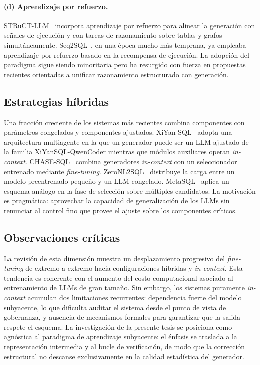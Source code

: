 \paragraph{(d) Aprendizaje por refuerzo.} STRuCT-LLM~\cite{STRuCT-LLM2025}
incorpora aprendizaje por refuerzo para alinear la generación con
señales de ejecución y con tareas de razonamiento sobre tablas y grafos
simultáneamente. Seq2SQL~\cite{Seq2SQL2017}, en una época mucho más
temprana, ya empleaba aprendizaje por refuerzo basado en la recompensa de
ejecución. La adopción del paradigma sigue siendo minoritaria pero ha
resurgido con fuerza en propuestas recientes orientadas a unificar
razonamiento estructurado con generación.

\subsection{Estrategias híbridas}
\label{subsec:sota-d1-hibridas}

Una fracción creciente de los sistemas más recientes combina componentes
con parámetros congelados y componentes ajustados.
XiYan-SQL~\cite{XiYan-SQL2024} adopta una arquitectura multiagente en la que
un generador puede ser un \ac{LLM} ajustado de la familia
XiYanSQL-QwenCoder mientras que módulos auxiliares operan
\emph{in-context}. CHASE-SQL~\cite{CHASE-SQL2025} combina generadores
\emph{in-context} con un seleccionador entrenado mediante \emph{fine-tuning}.
ZeroNL2SQL~\cite{ZeroNL2SQL2024} distribuye la carga entre un modelo
preentrenado pequeño y un \ac{LLM} congelado. MetaSQL~\cite{MetaSQL2024}
aplica un esquema análogo en la fase de selección sobre múltiples
candidatos. La motivación es pragmática: aprovechar la capacidad de
generalización de los \acp{LLM} sin renunciar al control fino que provee
el ajuste sobre los componentes críticos.

\subsection{Observaciones críticas}
\label{subsec:sota-d1-obs}

La revisión de esta dimensión muestra un desplazamiento progresivo del
\emph{fine-tuning} de extremo a extremo hacia configuraciones híbridas
y \emph{in-context}. Esta tendencia es coherente con el aumento del costo
computacional asociado al entrenamiento de \acp{LLM} de gran tamaño. Sin
embargo, los sistemas puramente \emph{in-context} acumulan dos
limitaciones recurrentes: dependencia fuerte del modelo subyacente, lo
que dificulta auditar el sistema desde el punto de vista de gobernanza, y
ausencia de mecanismos formales para garantizar que la salida respete
el esquema. La investigación de la presente tesis se posiciona como
agnóstica al paradigma de aprendizaje subyacente: el énfasis se traslada
a la representación intermedia y al bucle de verificación, de modo que
la corrección estructural no descanse exclusivamente en la calidad
estadística del generador.

